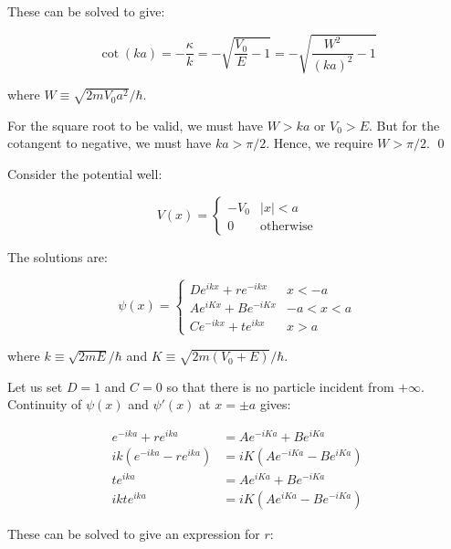 \documentclass[12pt]{article}
\begin{document}
These can be solved to give:

\begin{equation}
    \cot{(ka)} = -\frac{\kappa}{k} = -\sqrt{\frac{V_{0}}{E} - 1} = -\sqrt{\frac{W^{2}}{(ka)^{2}} - 1}
\end{equation}

where $W \equiv \sqrt{2mV_{0}a^{2}}/\hbar$.

For the square root to be valid, we must have $W > ka$ or $V_{0} > E$. But for the cotangent to negative, we must have $ka > \pi/2$. Hence, we require $W > \pi/2$.
\qed


Consider the potential well:

\begin{equation}
    V(x) =
    \begin{cases}
        -V_{0} & \left\lvert x \right\rvert < a \\
        0      & \text{otherwise}
    \end{cases}
\end{equation}

The solutions are:

\begin{equation}
    \psi(x) =
    \begin{cases}
        De^{ikx} + re^{-ikx} & x < -a     \\
        Ae^{iKx} + Be^{-iKx} & -a < x < a \\
        Ce^{-ikx} + te^{ikx} & x > a
    \end{cases}
\end{equation}

where $k \equiv \sqrt{2mE}/\hbar$ and $K \equiv \sqrt{2m(V_{0} + E)}/\hbar$.

Let us set $D = 1$ and $C = 0$ so that there is no particle incident from $+\infty$. Continuity of $\psi(x)$ and $\psi'(x)$ at $x = \pm a$ gives:

\begin{equation}
    \begin{split}
        e^{-ika} + re^{ika} &= Ae^{-iKa} + Be^{iKa} \\
        ik(e^{-ika} - re^{ika}) &= iK(Ae^{-iKa} - Be^{iKa}) \\
        te^{ika} &= Ae^{iKa} + Be^{-iKa} \\
        ikt e^{ika} &= iK(Ae^{iKa} - Be^{-iKa})
    \end{split}
\end{equation}

These can be solved to give an expression for $r$:
\end{document}
